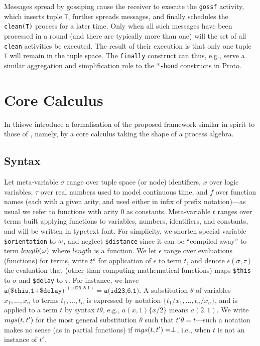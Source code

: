 \documentclass[12pt,a4paper,twoside,openright]{book}
\begin{document}
\noindent Messages spread by gossiping cause the receiver to execute the \texttt{gossf} activity, which inserts tuple \texttt{T}, further spreads messages, and finally schedules the \texttt{clean(T)} process for a later time.
%
Only when all such messages have been processed in a round (and there are typically more than one) will the set of all \texttt{clean} activities be executed.
%
The result of their execution is that only one tuple \texttt{T} will remain in the tuple space.  The \texttt{finally} construct can thus, e.g., serve a similar aggregation and simplification role to the *\texttt{-hood} constructs in Proto.

\section{Core Calculus}

In this\levelText{}we introduce a formalisation of the proposed framework similar in spirit to those of \cite{zavattaro,klaim,biochemicalTupleSpaces}, namely, by a core calculus taking the shape of a process algebra.

\subsection{Syntax}

Let meta-variable $\sigma$ range over tuple space (or node) identifiers, $x$ over logic variables, $\tau$ over real numbers used to model continuous time, and $f$ over function names (each with a given arity, and used either in infix of prefix notation)---as usual we refer to functions with arity 0 as constants.
%
Meta-variable $t$ ranges over terms built applying functions to variables, numbers, identifiers, and constants, and will be written in typetext font.
%
For simplicity, we shorten special variable \texttt{\$orientation} to $\omega$, and neglect \texttt{\$distance} since it can be ``compiled away'' to term $\textit{length}(\omega)$ where $\textit{length}$ is a function.
%
We let $\epsilon$ range over evaluations (functions) for terms, write $t^\epsilon$ for application of $\epsilon$ to term $t$, and denote $\epsilon(\sigma,\tau)$ the evaluation that (other than computing mathematical functions) maps \texttt{\$this} to $\sigma$ and \texttt{\$delay} to $\tau$.
%
For instance, we have $\texttt{a(\$this,1+\$delay)}^{\epsilon(\texttt{id23},\texttt{5.1})}=\texttt{a(id23,6.1)}$.
%
A substitution $\theta$ of variables $x_1,\ldots,x_n$ to terms $t_1,\ldots,t_n$ is expressed by notation $\{t_1/x_1,\ldots,t_n/x_n\}$, and is applied to a term $t$ by syntax $t\theta$, e.g., $a(x,1)\{x/2\}$ means $a(2,1)$.
%
We write $mgs(t,t')$ for the most general substitution $\theta$ such that $t'\theta=t$---such a notation makes no sense (as in partial functions) if $mgs(t,t')=\perp$, i.e., when $t$ is not an instance of $t'$.
\end{document}

